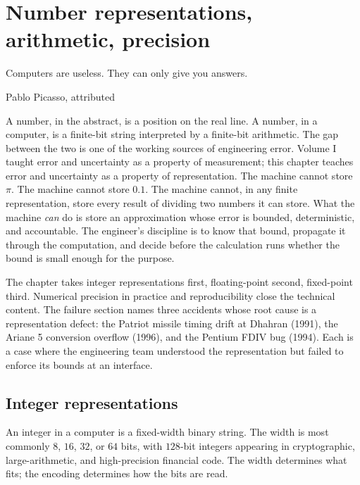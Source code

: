 \chapter{Number representations, arithmetic, precision}
\label{vol07:ch02}

\epigraph{Computers are useless. They can only give you answers.}{Pablo Picasso, attributed}


\noindent
A number, in the abstract, is a position on the real line. A number, in a computer, is a finite-bit string interpreted by a finite-bit arithmetic. The gap between the two is one of the working sources of engineering error. Volume I taught error and uncertainty as a property of measurement; this chapter teaches error and uncertainty as a property of representation. The machine cannot store $\pi$. The machine cannot store $0.1$. The machine cannot, in any finite representation, store every result of dividing two numbers it can store. What the machine \emph{can} do is store an approximation whose error is bounded, deterministic, and accountable. The engineer's discipline is to know that bound, propagate it through the computation, and decide before the calculation runs whether the bound is small enough for the purpose.

The chapter takes integer representations first, floating-point second, fixed-point third. Numerical precision in practice and reproducibility close the technical content. The failure section names three accidents whose root cause is a representation defect: the Patriot missile timing drift at Dhahran (1991), the Ariane 5 conversion overflow (1996), and the Pentium FDIV bug (1994). Each is a case where the engineering team understood the representation but failed to enforce its bounds at an interface.

\section{Integer representations}

An integer in a computer is a fixed-width binary string. The width is most commonly $8$, $16$, $32$, or $64$ bits, with $128$-bit integers appearing in cryptographic, large-arithmetic, and high-precision financial code. The width determines what fits; the encoding determines how the bits are read.

